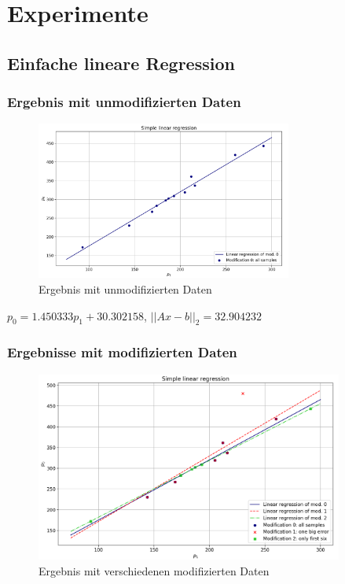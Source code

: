 \documentclass{beamer}
\begin{document}
\section{Experimente}
\subsection{Einfache lineare Regression}

\begin{frame} %
  \frametitle{Ergebnis mit unmodifizierten Daten} %
\begin{figure}
  \centering
    \includegraphics[width=0.75\textwidth]{unmodified}
    \vspace{-1em}
  \caption{Ergebnis mit unmodifizierten Daten}
\end{figure}
\vspace{-1em}
\centering
$p_0 = 1.450333p_1+30.302158$, $||Ax-b||_2=32.904232$

\end{frame}

\begin{frame} %
  \frametitle{Ergebnisse mit modifizierten Daten} %
  \begin{figure}
    \centering
      \includegraphics[width=0.9\textwidth]{Linear_Regression}
      \vspace{-1em}
    \caption{Ergebnis mit verschiedenen modifizierten Daten}
  \end{figure}
\end{frame}
\end{document}
